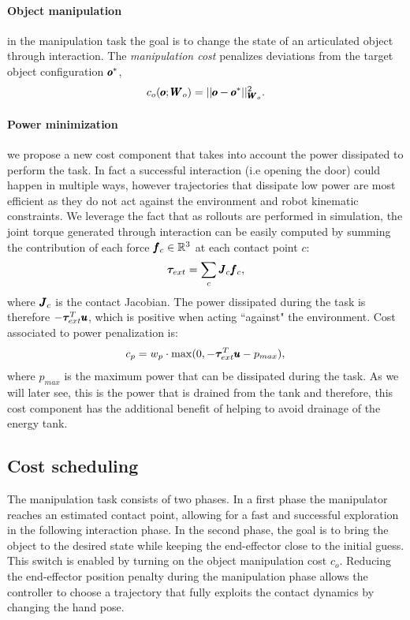  \paragraph{Object manipulation} in the manipulation task the goal is to change the state of an articulated object through interaction. The \textit{manipulation cost} penalizes deviations from the target object configuration $\pmb{o}^{*}$,
\begin{equation}
    c_o(\pmb{o}; \pmb{W}_{o}) = || \pmb{o} - \pmb{o}^{*}||^2_{\pmb{W}_{o}}.
\end{equation}
\paragraph{Power minimization} we propose a new cost component that takes into account the power dissipated to perform the task. In fact a successful interaction (i.e opening the door) could happen in multiple ways, however trajectories that dissipate low power are most efficient as they do not act against the environment and robot kinematic constraints. We leverage the fact that as rollouts are performed in simulation, the joint torque generated through interaction can be easily computed by summing the contribution of each force $\pmb{f}_c \in \mathbb{R}^{3}$ at each contact point $c$:
\begin{equation}
\boldsymbol{\tau}_{ext} = \sum\limits_{c} \pmb{J}_c \pmb{f}_c,    
\end{equation}
where $\pmb{J}_c$ is the contact Jacobian. The power dissipated during the task is therefore $-\boldsymbol{\tau}_{ext}^T\pmb{u}$, which is positive when acting ``against" the environment. Cost associated to power penalization is:
\begin{equation}
   c_p = w_{p} \cdot \max(0, - \boldsymbol{\tau}_{ext}^T\pmb{u} - p_{max}),      
 \end{equation}
where $p_{max}$ is the maximum power that can be dissipated during the task.
As we will later see, this is the power that is drained from the tank and therefore, this cost component has the additional benefit of helping to avoid drainage of the energy tank.

\subsection{Cost scheduling}
The manipulation task consists of two phases. In a first phase the manipulator reaches an estimated contact point, allowing for a fast and successful exploration in the following interaction phase. In the second phase, the goal is to bring the object to the desired state while keeping the end-effector close to the initial guess. This switch is enabled by turning on the object manipulation cost $c_o$. Reducing the end-effector position penalty during the manipulation phase allows the controller to choose a trajectory that fully exploits the contact dynamics by changing the hand pose. 


